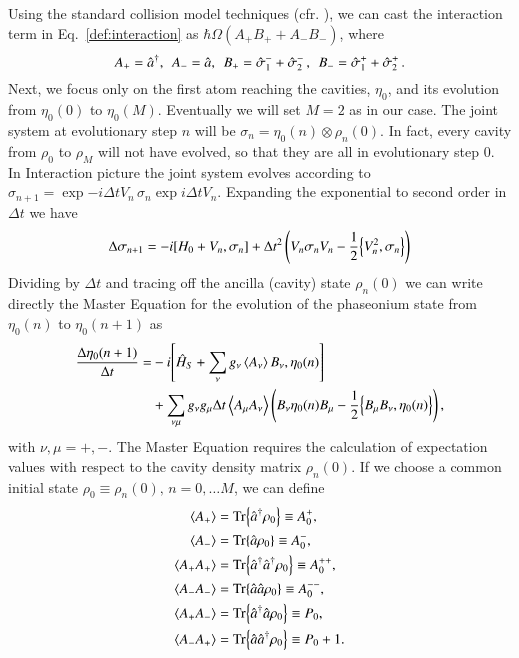 \renewenvironment{imported}{
    \newcommand{\s}{\hat{\sigma}}
}{}

\begin{imported}

Using the standard collision model techniques (cfr. \cite{ciccarello_quantum-collision_2022}), we can cast the interaction term in Eq.~\ref{def:interaction} as $\hbar\Omega(A_+B_+ + A_-B_-)$, where
\begin{equation}
    A_+ = \ad,\;\,A_-=\a,\;\,B_+=\s_1^-+\s_2^-\,,\;\,B_-=\s_1^++\s_2^+\,.
\end{equation}
Next, we focus only on the first atom reaching the cavities, $\eta_0$, and its evolution from $\eta_0(0)$ to $\eta_0(M)$.
Eventually we will set $M=2$ as in our case.
The joint system at evolutionary step $n$ will be $\sigma_n = \eta_0(n)\otimes\rho_{n}(0)$.
In fact, every cavity from $\rho_0$ to $\rho_M$ will not have evolved, so that they are all in evolutionary step $0$.
In Interaction picture the joint system evolves according to $\sigma_{n+1}=\exp{-i\Delta tV_n}\,\sigma_n\exp{i\Delta tV_n}$.
Expanding the exponential to second order in $\Delta t$ we have
\begin{equation}
    \Delta\sigma_{n+1} = -i\comm{H_0+V_n}{\sigma_n}+\Delta t^2\left( V_n\sigma_nV_n-\frac{1}{2}\acomm{V_n^2}{\sigma_n}\right)
\end{equation}
Dividing by $\Delta t$ and tracing off the ancilla (cavity) state $\rho_n(0)$ we can write directly the Master Equation for the evolution of the phaseonium state from $\eta_0(n)$ to $\eta_0(n+1)$ as
\begin{align}
    \frac{\Delta\eta_0(n+1)}{\Delta t} =& -i\comm{\hat{H}_S+\sum_\nu g_\nu\ev{A_\nu}B_\nu}{\eta_0(n)} \\
    &+\sum_{\nu\mu}g_\nu g_\mu\Delta t\ev{A_\mu A_\nu}\left( B_\nu\eta_0(n)B_\mu-\frac{1}{2}\acomm{B_\mu B_\nu}{\eta_0(n)} \right),
\end{align}
with $\nu,\mu = +,-$.
The Master Equation requires the calculation of expectation values with respect to the cavity density matrix $\rho_n(0)$. If we choose a common initial state $\rho_0\equiv\rho_n(0),\,n=0,\ldots M$, we can define
\begin{align}
    \ev{A_+} &= \Tr{\ad\rho_0}\equiv A^+_0,\\
    \ev{A_-} &= \Tr{\a\rho_0}\equiv A^-_0,\\
    \ev{A_+ A_+} &= \Tr{\ad\ad\rho_0}\equiv A^{++}_0,\\
    \ev{A_- A_-} &= \Tr{\a\a\rho_0}\equiv A^{--}_0,\\
    \ev{A_+ A_-} &= \Tr{\ad\a\rho_0}\equiv P_0,\\
    \ev{A_- A_+} &= \Tr{\a\ad\rho_0}\equiv P_0 + 1.\\
\end{align}


\end{imported}